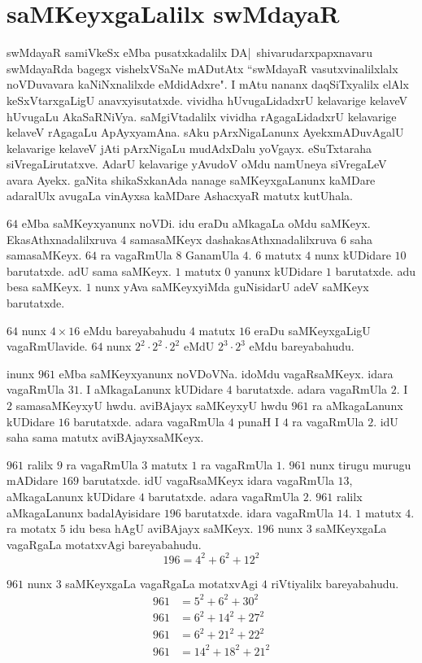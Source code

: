 \chapter{saMKeyxgaLalilx swMdayaR}

swMdayaR samiVkeSx eMba pusatxkadalilx DA|~shivarudarxpapxnavaru swMdayaRda bagegx vishelxVSaNe mADutAtx ``swMdayaR vasutxvinalilxlalx noVDuvavara kaNiNxnalilxde eMdidAdxre". I mAtu nananx daqSiTxyalilx elAlx keSxVtarxgaLigU anavxyisutatxde. vividha hUvugaLidadxrU kelavarige kelaveV hUvugaLu AkaSaRNiVya. saMgiVtadalilx vividha rAgagaLidadxrU kelavarige kelaveV rAgagaLu ApAyxyamAna. sAku pArxNigaLanunx AyekxmADuvAgalU kelavarige kelaveV jAti pArxNigaLu mudAdxDalu yoVgayx. eSuTxtaraha siVregaLirutatxve. AdarU kelavarige yAvudoV oMdu namUneya siVregaLeV avara Ayekx. gaNita shikaSxkanAda nanage saMKeyxgaLanunx kaMDare adaralUlx avugaLa vinAyxsa kaMDare AshacxyaR matutx kutUhala.

$64$ eMba saMKeyxyanunx noVDi. idu eraDu aMkagaLa oMdu saMKeyx. EkasAthxna\-dalilxruva $4$ samasaMKeyx dashakasAthxnadalilxruva $6$ saha samasaMKeyx. $64$ ra vagaRmUla $8$ GanamUla $4$. $6$ matutx $4$ nunx kUDidare $10$ barutatxde. adU sama saMKeyx. $1$ matutx $0$ yanunx kUDidare $1$ barutatxde. adu besa saMKeyx. $1$ nunx yAva saMKeyxyiMda guNisidarU adeV saMKeyx barutatxde.

$64$ nunx $4\times 16$ eMdu bareyabahudu $4$ matutx $16$ eraDu saMKeyxgaLigU vagaRmUlavide. $64$ nunx $2^2\cdot 2^2\cdot 2^2$ eMdU $2^3\cdot2^3$ eMdu bareyabahudu.

inunx $961$ eMba saMKeyxyanunx noVDoVNa. idoMdu vagaRsaMKeyx. idara vagaRmUla $31$. I aMkagaLanunx kUDidare $4$ barutatxde. adara vagaRmUla $2$. I $2$ samasaMKeyxyU hwdu. aviBAjayx saMKeyxyU hwdu $961$ ra aMkagaLanunx kUDidare $16$ barutatxde. adara vagaRmUla $4$ punaH I $4$ ra vagaRmUla $2$. idU saha sama matutx aviBAjayxsaMKeyx.

$961$ ralilx $9$ ra vagaRmUla $3$ matutx $1$ ra vagaRmUla $1$. $961$ nunx tirugu murugu mADidare $169$ barutatxde. idU vagaRsaMKeyx idara vagaRmUla $13$, aMka\-gaLanunx kUDidare $4$ barutatxde. adara vagaRmUla $2$. $961$ ralilx aMkagaLanunx badalAyi\-sidare $196$ barutatxde. idara vagaRmUla $14$. $1$ matutx $4$. ra motatx $5$ idu besa hAgU aviBAjayx saMKeyx. $196$ nunx $3$ saMKeyxgaLa vagaRgaLa motatxvAgi bareyabahudu.
$$
196 = 4^2+6^2+12^2
$$

$961$ nunx $3$ saMKeyxgaLa vagaRgaLa motatxvAgi $4$ riVtiyalilx bareyabahudu.
\begin{align*}
961 &= 5^2+6^2+30^2\\
961 &= 6^2+14^2+27^2\\
961 &= 6^2+21^2+22^2\\
961 &= 14^2+18^2+21^2
\end{align*}

